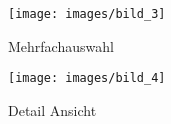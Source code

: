 \begin{wrapfigure}{r}{0.25\textwidth}
\label{Bild3}
\centering
\texttt{[image: images/bild\_3]}
\caption{Mehrfachauswahl}
\end{wrapfigure} 


\begin{wrapfigure}{r}{0.3\textwidth}
\label{Bild4}
\begin{center}
\texttt{[image: images/bild\_4]}
\end{center}

\caption{Detail Ansicht}
\end{wrapfigure}

